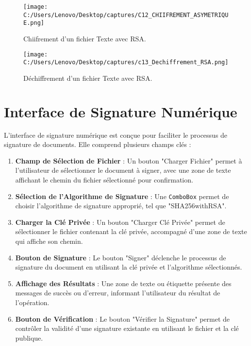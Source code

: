 \documentclass[a4paper,12pt]{report}
\begin{document}
 
 \begin{figure}[h!]
 	\centering
 	\texttt{[image: C:/Users/Lenovo/Desktop/captures/C12\_CHIIFREMENT\_ASYMETRIQUE.png]}
 	\caption{Chiifrement d'un fichier Texte avec  RSA.}
 \end{figure}
 
  \begin{figure}[h!]
 	\centering
 	\texttt{[image: C:/Users/Lenovo/Desktop/captures/c13\_Dechiffrement\_RSA.png]}
 	\caption{Déchiffrement  d'un fichier Texte avec  RSA.}
 \end{figure}
 
 \clearpage
 
  \section{Interface de Signature Numérique}
  
  L'interface de signature numérique est conçue pour faciliter le processus de signature de documents. Elle comprend plusieurs champs clés :
  
  \begin{enumerate}
  
  	
  	\item \textbf{Champ de Sélection de Fichier} : Un bouton "Charger Fichier" permet à l'utilisateur de sélectionner le document à signer, avec une zone de texte affichant le chemin du fichier sélectionné pour confirmation.
  	
  	\item \textbf{Sélection de l'Algorithme de Signature} : Une \texttt{ComboBox} permet de choisir l'algorithme de signature approprié, tel que "SHA256withRSA".
  	
  	\item \textbf{Charger la Clé Privée} : Un bouton "Charger Clé Privée" permet de sélectionner le fichier contenant la clé privée, accompagné d'une zone de texte qui affiche son chemin.
  	
  	\item \textbf{Bouton de Signature} : Le bouton "Signer" déclenche le processus de signature du document en utilisant la clé privée et l'algorithme sélectionnés.
  	
  	\item \textbf{Affichage des Résultats} : Une zone de texte ou étiquette présente des messages de succès ou d'erreur, informant l'utilisateur du résultat de l'opération.
  	
  	\item \textbf{Bouton de Vérification} : Le bouton "Vérifier la Signature" permet de contrôler la validité d'une signature existante en utilisant le fichier et la clé publique.
  \end{enumerate}
  
\end{document}
